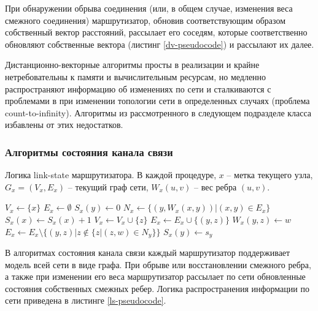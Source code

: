 \documentclass[specification,annotation,times]{itmo-student-thesis}
\theoremstyle{definition}
\begin{document}
При обнаружении обрыва соединения (или, в общем случае, изменения веса смежного
соединения) маршрутизатор, обновив соответствующим образом собственный вектор
расстояний, рассылает его соседям, которые соответственно обновляют собственные
вектора (листинг \ref{dv-pseudocode}) и рассылают их далее.

Дистанционно-векторные алгоритмы просты в реализации и крайне нетребовательны к
памяти и вычислительным ресурсам, но медленно распространяют информацию об
изменениях по сети и сталкиваются с проблемами в при изменении топологии сети в
определенных случаях (проблема count-to-infinity). Алгоритмы из рассмотренного в
следующем подразделе класса избавлены от этих недостатков.

\subsubsection{Алгоритмы состояния канала связи}\label{overview:link-state}

\begin{algorithm}[!h]
\caption{Логика link-state маршрутизатора. В каждой процедуре, $x$ -- метка
  текущего узла, $G_x = (V_x, E_x)$ -- текущий граф сети, $W_x(u, v)$ -- вес ребра
  $(u, v)$.}
\label{ls-pseudocode}
\begin{algorithmic}[1]
    \State $V_x \gets \{x\}$
    \State $E_x \gets \emptyset$
      \State $S_x(y) \gets 0$
    \EndFor
    \State {}
  \EndProcedure
  \Statex
    \State $N_x \gets \{(y, W_x(x, y)) | (x, y) \in E_x\}$
      \State {}
    \EndFor
    \State $S_x(x) \gets S_x(x) + 1$
  \EndProcedure
  \Statex
       
        \State $V_x \gets V_x \cup \{z\}$
        \State $E_x \gets E_x \cup \{(y, z)\}$
        \State $W_x(y, z) \gets w$
      \EndFor
      \State $E_x \gets E_x \setminus \{(y, z) | z \notin \{z | (z, w) \in N_y \} \}$
      \State $S_x(y) \gets s_y$
        \State {}
      \EndFor
    \EndIf
	\EndProcedure
\end{algorithmic}
\end{algorithm}

В алгоритмах состояния канала связи каждый маршрутизатор поддерживает модель
всей сети в виде графа. При обрыве или восстановлении смежного ребра, а также при
изменении его веса маршрутизатор рассылает по сети обновленные состояния
собственных смежных ребер. Логика распространения информации по сети приведена в
листинге \ref{ls-pseudocode}.
\end{document}
